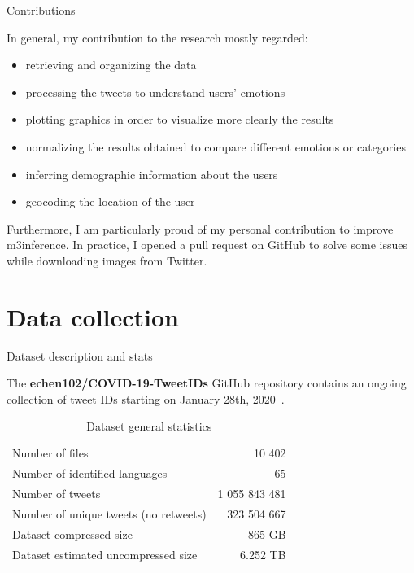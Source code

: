 \documentclass[8pt]{beamer}  %
\begin{document}
\begin{frame}{Contributions}

    In general, my contribution to the research mostly regarded:
    
    \begin{itemize}
    	\item retrieving and organizing the data
    	\item processing the tweets to understand users' emotions
    	\item plotting graphics in order to visualize more clearly the results
    	\item normalizing the results obtained to compare different emotions or categories
    	\item inferring demographic information about the users
    	\item geocoding the location of the user
    \end{itemize}
    
    Furthermore, I am particularly proud of my personal contribution to improve m3inference. In practice, I opened a pull request on GitHub to solve some issues while downloading images from Twitter.

\end{frame}

\section{Data collection}

\begin{frame}{Dataset description and stats}

	The \textbf{echen102/COVID-19-TweetIDs} GitHub repository contains an ongoing collection of tweet IDs starting on January 28th, 2020~\autocite{chen2020tracking}.
	
	\begin{table}[H]
        \centering
        \begin{tabular}{lr}
            Number of files & 10 402
            \\
            Number of identified languages & 65
            \\
            Number of tweets & 1 055 843 481
            \\
            Number of unique tweets (no retweets) & 323 504 667
            \\
            Dataset compressed size & 865 GB
            \\
            Dataset estimated uncompressed size & 6.252 TB
        \end{tabular}
        \caption{Dataset general statistics}
        \label{tab:dataset-stats}
    \end{table}

\end{frame}
\end{document}
